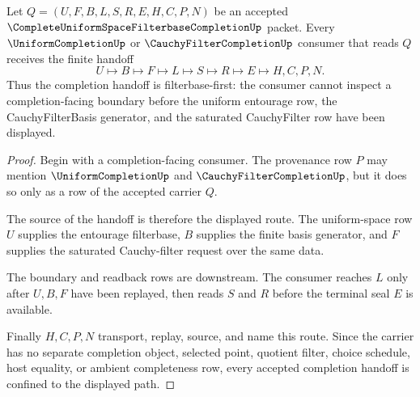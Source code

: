 \begin{theorem}
\label{thm:complete-uniform-space-cauchy-filter-completion-handoff}
Let $Q=(U,F,B,L,S,R,E,H,C,P,N)$ be an accepted $\CompleteUniformSpaceFilterbaseCompletionUp$ packet. Every $\UniformCompletionUp$ or $\CauchyFilterCompletionUp$ consumer that reads $Q$ receives the finite handoff
$$
U \longmapsto B \longmapsto F \longmapsto L \longmapsto S \longmapsto R \longmapsto E \longmapsto H,C,P,N .
$$
Thus the completion handoff is filterbase-first: the consumer cannot inspect a completion-facing boundary before the uniform entourage row, the CauchyFilterBasis generator, and the saturated CauchyFilter row have been displayed.
\end{theorem}
\begin{proof}
Begin with a completion-facing consumer. The provenance row $P$ may mention $\UniformCompletionUp$ and $\CauchyFilterCompletionUp$, but it does so only as a row of the accepted carrier $Q$.

The source of the handoff is therefore the displayed route. The uniform-space row $U$ supplies the entourage filterbase, $B$ supplies the finite basis generator, and $F$ supplies the saturated Cauchy-filter request over the same data.

The boundary and readback rows are downstream. The consumer reaches $L$ only after $U,B,F$ have been replayed, then reads $S$ and $R$ before the terminal seal $E$ is available.

Finally $H,C,P,N$ transport, replay, source, and name this route. Since the carrier has no separate completion object, selected point, quotient filter, choice schedule, host equality, or ambient completeness row, every accepted completion handoff is confined to the displayed path.
\end{proof}


